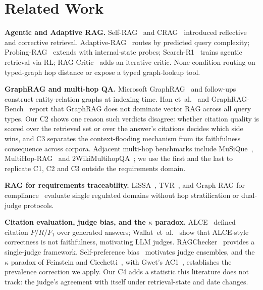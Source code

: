 \section{Related Work}
\label{sec:related}

\noindent\textbf{Agentic and Adaptive RAG.}
Self-RAG~\cite{selfrag2024} and CRAG~\cite{crag2024} introduced reflective
and corrective retrieval. Adaptive-RAG~\cite{adaptiverag2024} routes by
predicted query complexity; Probing-RAG~\cite{probingrag2025} extends with
internal-state probes; Search-R1~\cite{searchr1_2025} trains agentic
retrieval via RL; RAG-Critic~\cite{ragcritic2025} adds an iterative critic.
None condition routing on typed-graph hop distance or expose a typed
graph-lookup tool.

\noindent\textbf{GraphRAG and multi-hop QA.}
Microsoft GraphRAG~\cite{graphrag2024} and follow-ups~\cite{lightrag2024,hipporag2_2025,graphr1_2025} construct entity-relation graphs at indexing
time. Han et~al.~\cite{ragvsgraphrag2025} and GraphRAG-Bench~\cite{graphragbench2026}
report that GraphRAG does not dominate vector RAG across all query
types. Our C2 shows one reason such verdicts disagree: whether
citation quality is scored over the retrieved set or over the answer's
citations decides which side wins, and C3 separates the
context-flooding mechanism from its faithfulness consequence across
corpora. Adjacent multi-hop benchmarks include
MuSiQue~\cite{musique2022}, MultiHop-RAG~\cite{multihoprag2024} and
2WikiMultihopQA~\cite{twowiki2020}; we use the first and the last to
replicate C1, C2 and C3 outside the requirements domain.

\noindent\textbf{RAG for requirements traceability.}
LiSSA~\cite{lissa2025}, TVR~\cite{niu_tvr2025}, and Graph-RAG for
compliance~\cite{graphragcompliance2024} evaluate single regulated domains
without hop stratification or dual-judge protocols.

\noindent\textbf{Citation evaluation, judge bias, and the $\kappa$ paradox.}
ALCE~\cite{alce2023} defined citation $P/R/F_1$ over generated
answers; Wallat~et~al.~\cite{wallat2024} show that ALCE-style
correctness is not faithfulness, motivating LLM judges. RAGChecker~\cite{ragchecker2024}
provides a single-judge framework. Self-preference
bias~\cite{selfpref_bias2024} motivates judge ensembles, and the
$\kappa$ paradox of Feinstein and Cicchetti~\cite{feinstein1990},
with Gwet's AC1~\cite{gwet2008}, establishes the prevalence
correction we apply. Our C4 adds a
statistic this literature does not track: the judge's agreement with
itself under retrieval-state and date changes.

